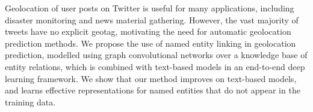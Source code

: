 Geolocation of user posts on Twitter is useful for many applications, including disaster monitoring and news material gathering. However, the vast majority of tweets have no explicit geotag, motivating the need for automatic geolocation prediction methods. We propose the use of named entity linking in geolocation prediction, modelled using graph convolutional networks over a knowledge base of entity relations, which is combined with text-based models in an end-to-end deep learning framework. We show that our method improves on text-based models, and learns effective representations for named entities that do not appear in the training data.
